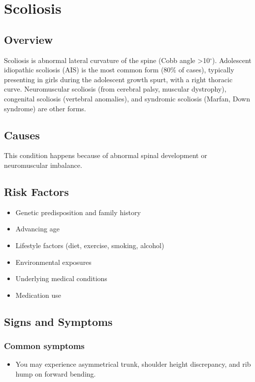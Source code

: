 \chapter{Scoliosis}
\label{sec:Scoliosis}

\section{Overview}
Scoliosis is abnormal lateral curvature of the spine (Cobb angle >10$^\circ$). Adolescent idiopathic scoliosis (AIS) is the most common form (80\% of cases), typically presenting in girls during the adolescent growth spurt, with a right thoracic curve. Neuromuscular scoliosis (from cerebral palsy, muscular dystrophy), congenital scoliosis (vertebral anomalies), and syndromic scoliosis (Marfan, Down syndrome) are other forms.
\section{Causes}
This condition happens because of abnormal spinal development or neuromuscular imbalance.     
\section{Risk Factors}

\begin{itemize}[noitemsep]
  \item Genetic predisposition and family history
  \item Advancing age
  \item Lifestyle factors (diet, exercise, smoking, alcohol)
  \item Environmental exposures
  \item Underlying medical conditions
  \item Medication use
\end{itemize}
\section{Signs and Symptoms}

\subsection{Common symptoms}
\begin{itemize}[noitemsep]
  \item You may experience asymmetrical trunk, shoulder height discrepancy, and rib hump on forward bending. 
  \end{itemize}


